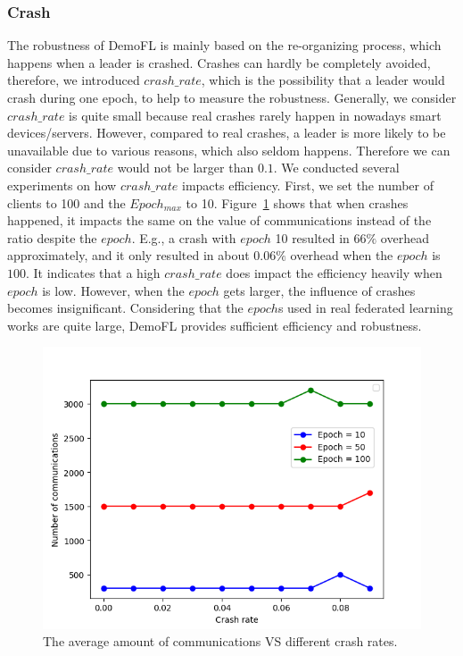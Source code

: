 \subsubsection{Crash}
The robustness of DemoFL is mainly based on the re-organizing process, which happens when a leader is crashed. Crashes can hardly be completely avoided, therefore, we introduced $crash\_rate$, which is the possibility that a leader would crash during one epoch, to help to measure the robustness. Generally, we consider $crash\_rate$ is quite small because real crashes rarely happen in nowadays smart devices/servers. However, compared to real crashes, a leader is more likely to be unavailable due to various reasons, which also seldom happens. Therefore we can consider $crash\_rate$ would not be larger than $0.1$. We conducted several experiments on how $crash\_rate$ impacts efficiency. First, we set the number of clients to 100 and the $Epoch_{max}$ to 10. Figure~\ref{comm-crash} shows that when crashes happened, it impacts the same on the value of communications instead of the ratio despite the $epoch$. E.g., a crash with $epoch$ 10 resulted in $66\%$ overhead approximately, and it only resulted in about $0.06\%$ overhead when the $epoch$ is $100$. It indicates that a high $crash\_rate$ does impact the efficiency heavily when $epoch$ is low. However, when the $epoch$ gets larger, the influence of crashes becomes insignificant. Considering that the $epoch$s used in real federated learning works are quite large, DemoFL provides sufficient efficiency and robustness.

\begin{figure}[!ht]
    \centering
    \includegraphics[width=\columnwidth]{img/comm-crash.png}
    \caption{The average amount of communications VS different crash rates.}
    \label{comm-crash}
\end{figure}

